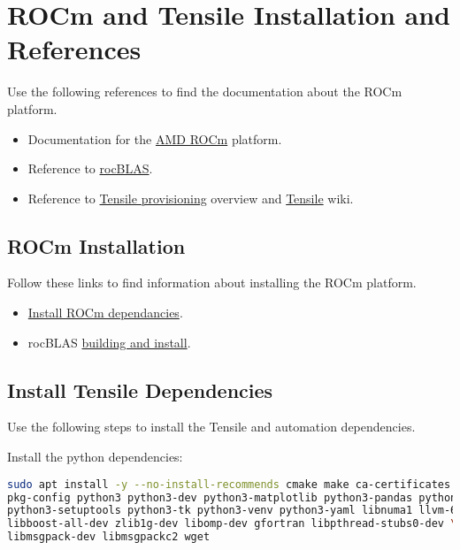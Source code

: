 \documentclass[]{article}
\begin{document}
\appendix
\section{ROCm and Tensile Installation and References}
\label{sec:appendixA}

Use the following references to find the documentation about the ROCm platform.
\begin{itemize}
	\item Documentation for the \href{https://rocmdocs.amd.com/en/latest/}{AMD ROCm} platform.
	\item Reference to \href{https://rocBLAS.readthedocs.io/en/latest/intro.html}{rocBLAS}.
	\item Reference to \href{https://github.com/ROCmSoftwarePlatform/Tensile/tree/develop/tuning}{Tensile provisioning} overview and \href{https://github.com/ROCmSoftwarePlatform/Tensile/wiki}{Tensile} wiki.
\end{itemize}

\subsection{ROCm Installation}

Follow these links to find information about installing the ROCm platform. \newline

\begin{itemize}
	\item \href{https://rocmdocs.amd.com/en/latest/Installation_Guide/Installation-Guide.html}{Install ROCm dependancies}.
	\item rocBLAS \href{https://rocBLAS.readthedocs.io/en/latest/install.html}{building and install}.
\end{itemize}

\subsection{Install Tensile Dependencies}
\label{sec:dependencies}

Use the following steps to install the Tensile and automation dependencies. \newline

\noindent Install the python dependencies:

\begin{lstlisting}[language=bash,breaklines=true]
sudo apt install -y --no-install-recommends cmake make ca-certificates git \
pkg-config python3 python3-dev python3-matplotlib python3-pandas python3-pip \
python3-setuptools python3-tk python3-venv python3-yaml libnuma1 llvm-6.0-dev \
libboost-all-dev zlib1g-dev libomp-dev gfortran libpthread-stubs0-dev \
libmsgpack-dev libmsgpackc2 wget
\end{lstlisting}
\end{document}

